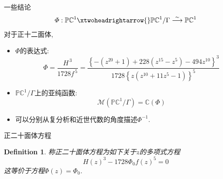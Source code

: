 \documentclass[pdf]{beamer}
\numberwithin{equation}{section}
\theoremstyle{plain}
\newtheorem{defn}[theorem]{Definition}
\theoremstyle{plain}
\theoremstyle{remark}
\begin{document}
	\begin{frame}[label=invarient2]{一些结论}
\hspace{-2em}
$$\varPhi:\mathbb{PC}^1\xtwoheadrightarrow{}\mathbb{PC}^1/\Gamma\overset{\sim}{\longrightarrow}\mathbb{PC}^1$$
对于正十二面体,
\begin{itemize}[<+->]
	\item $\varPhi$的表达式: $\, $ \hyperlink{invarient1}{}
	$$\varPhi=\frac{H^{\,3}}{1728f^{\,5}}=\frac{\left\{-(z^{20}+1)+228(z^{15}-z^5)-494z^{10}\right\}^3}{1728\left\{z(z^{10}+11z^5-1)\right\}^5}$$
	\item $\mathbb{PC}^1/\Gamma$上的亚纯函数:
	$$\mathcal{M}(\mathbb{PC}^1/\Gamma)=\mathbb{C}(\varPhi)$$
	\item 可以分别从复分析和近世代数的角度描述$\varPhi^{-1}$.
\end{itemize}
\end{frame}
	\begin{frame}{正二十面体方程}
\begin{defn}
	称正二十面体方程为如下关于$z$的多项式方程
	$$H(z)^3-1728\varPhi_0 f(z)^5=0$$
	这等价于方程$\varPhi(z)=\varPhi_0$.
\end{defn}
\end{frame}
%	

\end{document}
